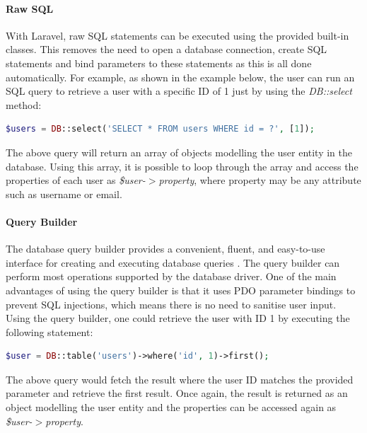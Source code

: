 \paragraph{Raw SQL}
With Laravel, raw SQL statements can be executed using the provided built-in classes. This removes the need to open a database connection, create SQL statements and bind parameters to these statements as this is all done automatically. For example, as shown in the example below, the user can run an SQL query to retrieve a user with a specific ID of 1 just by using the \emph{DB::select} method:

\begin{lstlisting}[language=php]
	$users = DB::select('SELECT * FROM users WHERE id = ?', [1]);
\end{lstlisting}

\noindent The above query will return an array of objects modelling the user entity in the database. Using this array, it is possible to loop through the array and access the properties of each user as \emph{\$user-$>$property}, where property may be any attribute such as username or email.

\paragraph{Query Builder}
The database query builder provides a convenient, fluent, and easy-to-use interface for creating and executing database queries \cite{Laravel:QueryBuilder}. The query builder can perform most operations supported by the database driver. One of the main advantages of using the query builder is that it uses PDO parameter bindings to prevent SQL injections, which means there is no need to sanitise user input. Using the query builder, one could retrieve the user with ID 1 by executing the following statement:

\begin{lstlisting}[language=php]
	$user = DB::table('users')->where('id', 1)->first();
\end{lstlisting}

\noindent The above query would fetch the result where the user ID matches the provided parameter and retrieve the first result. Once again, the result is returned as an object modelling the user entity and the properties can be accessed again as \emph{\$user-$>$property}.

